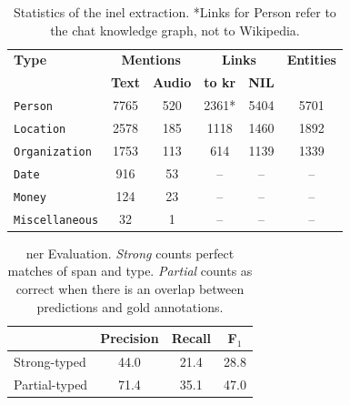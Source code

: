 \begin{table}[htbp]
    \centering
    \begin{tabular}{l|cc|cc|c}
      \toprule
      \textbf{Type} & \multicolumn{2}{c|}{\textbf{Mentions}} & \multicolumn{2}{c|}{\textbf{Links}} & \textbf{Entities} \\
      & \textbf{Text}  & \textbf{Audio} & \textbf{to \ac{kr}} & \textbf{NIL} & \\
      \midrule
      \texttt{Person} & 7765 & 520 & 2361* & 5404 & 5701 \\
      \texttt{Location} & 2578 & 185 & 1118 & 1460 & 1892 \\
      \texttt{Organization} & 1753 & 113 & 614 & 1139 & 1339 \\
      \texttt{Date} & 916 & 53 & -- & -- & -- \\
      \texttt{Money} & 124 & 23 & -- & -- & -- \\
      \texttt{Miscellaneous} & 32 & 1 & -- & -- & -- \\
      \bottomrule
    \end{tabular}
    \caption{Statistics of the \ac{inel} extraction. *Links for Person refer to the chat knowledge graph, not to Wikipedia.}
    \label{tab:stats}
\end{table}

\begin{table}[htbp]
    \centering
    \begin{tabular}{lccc}
      \toprule
      & \textbf{Precision} & \textbf{Recall} & \textbf{F$_1$} \\
      \midrule
      Strong-typed & 44.0 & 21.4 & 28.8 \\
      Partial-typed & 71.4 & 35.1 & 47.0 \\
      \bottomrule
    \end{tabular}
    \caption{\ac{ner} Evaluation. \textit{Strong} counts perfect matches of span and type. \textit{Partial} counts as correct when there is an overlap between predictions and gold annotations.}
    \label{tab:eval}
\end{table}




